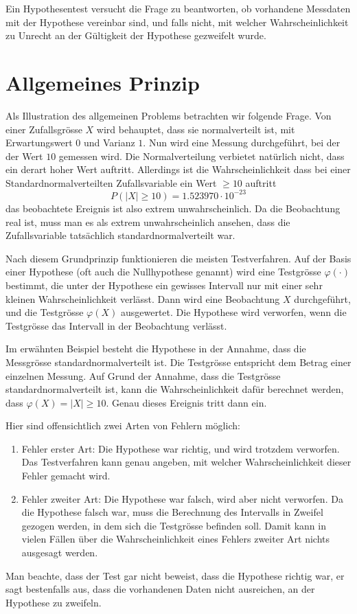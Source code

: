 Ein Hypothesentest versucht die Frage zu beantworten, ob vorhandene
Messdaten mit der Hypothese vereinbar sind, und falls nicht, mit welcher
Wahrscheinlichkeit zu Unrecht an der Gültigkeit der Hypothese gezweifelt
wurde.

\section{Allgemeines Prinzip}
Als Illustration des allgemeinen Problems betrachten wir folgende Frage.
Von einer Zufallsgrösse $X$ wird behauptet, dass sie normalverteilt ist,
mit Erwartungswert $0$ und Varianz $1$.
Nun wird eine Messung durchgeführt, bei der der Wert $10$ gemessen wird.
Die Normalverteilung verbietet natürlich
nicht, dass ein derart hoher Wert auftritt.
Allerdings ist die
Wahrscheinlichkeit dass bei einer Standardnormalverteilten Zufallsvariable
ein Wert $\ge 10$ auftritt
\[
P(|X|\ge 10)=1.523970\cdot 10^{-23}
\]
das beobachtete Ereignis ist also extrem unwahrscheinlich.
Da die Beobachtung
real ist, muss man es als extrem unwahrscheinlich ansehen, dass die
Zufallsvariable tatsächlich standardnormalverteilt war.

Nach diesem Grundprinzip funktionieren die meisten Testverfahren.
Auf der Basis einer Hypothese (oft auch die Nullhypothese genannt)
wird eine Testgrösse $\varphi(\cdot)$ bestimmt, die 
unter der Hypothese ein gewisses Intervall nur mit einer sehr kleinen
Wahrscheinlichkeit verlässt.
Dann wird eine Beobachtung $X$ durchgeführt, und die Testgrösse
$\varphi(X)$ ausgewertet.
Die Hypothese wird verworfen, wenn die
Testgrösse das Intervall in der Beobachtung verlässt.

Im erwähnten Beispiel besteht die Hypothese in der Annahme, dass die
Messgrösse standardnormalverteilt ist.
Die Testgrösse entspricht dem Betrag einer einzelnen Messung.
Auf Grund der Annahme, dass die Testgrösse
standardnormalverteilt ist, kann die Wahrscheinlichkeit dafür berechnet
werden, dass $\varphi(X)=|X|\ge10$.
Genau dieses Ereignis tritt dann ein.

Hier sind offensichtlich zwei Arten von Fehlern möglich:
\begin{enumerate}
\item Fehler erster Art: Die Hypothese war richtig, und wird trotzdem verworfen.
Das Testverfahren kann genau angeben, mit welcher Wahrscheinlichkeit
dieser Fehler gemacht wird.
\item Fehler zweiter Art: Die Hypothese war falsch, wird aber nicht verworfen.
Da die Hypothese falsch war, muss die Berechnung des Intervalls in Zweifel
gezogen werden, in dem sich die Testgrösse befinden soll.
Damit kann
in vielen Fällen über die Wahrscheinlichkeit eines Fehlers zweiter
Art nichts ausgesagt werden.
\end{enumerate}
Man beachte, dass der Test gar nicht beweist, dass die Hypothese richtig
war, er sagt bestenfalls aus, dass die vorhandenen Daten nicht ausreichen,
an der Hypothese zu zweifeln.

